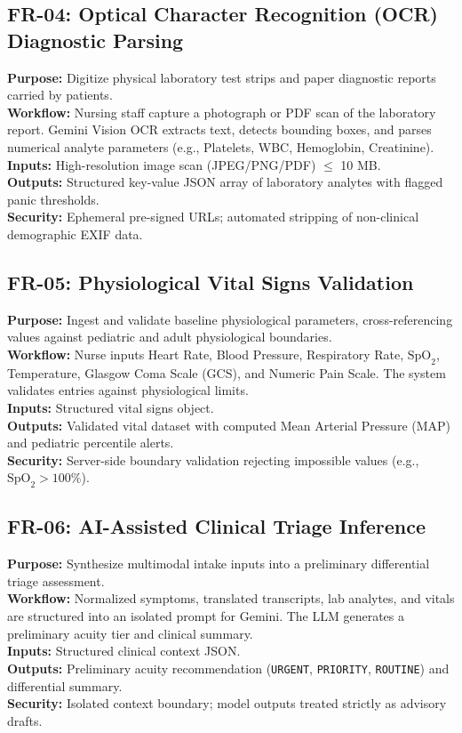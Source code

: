 \documentclass[11pt,a4paper,oneside]{report}
\begin{document}
\subsection{FR-04: Optical Character Recognition (OCR) Diagnostic Parsing}
\textbf{Purpose:} Digitize physical laboratory test strips and paper diagnostic reports carried by patients.\\
\textbf{Workflow:} Nursing staff capture a photograph or PDF scan of the laboratory report. Gemini Vision OCR extracts text, detects bounding boxes, and parses numerical analyte parameters (e.g., Platelets, WBC, Hemoglobin, Creatinine).\\
\textbf{Inputs:} High-resolution image scan (JPEG/PNG/PDF) $\le$ 10 MB.\\
\textbf{Outputs:} Structured key-value JSON array of laboratory analytes with flagged panic thresholds.\\
\textbf{Security:} Ephemeral pre-signed URLs; automated stripping of non-clinical demographic EXIF data.

\subsection{FR-05: Physiological Vital Signs Validation}
\textbf{Purpose:} Ingest and validate baseline physiological parameters, cross-referencing values against pediatric and adult physiological boundaries.\\
\textbf{Workflow:} Nurse inputs Heart Rate, Blood Pressure, Respiratory Rate, $\text{SpO}_2$, Temperature, Glasgow Coma Scale (GCS), and Numeric Pain Scale. The system validates entries against physiological limits.\\
\textbf{Inputs:} Structured vital signs object.\\
\textbf{Outputs:} Validated vital dataset with computed Mean Arterial Pressure (MAP) and pediatric percentile alerts.\\
\textbf{Security:} Server-side boundary validation rejecting impossible values (e.g., $\text{SpO}_2 > 100\%$).

\subsection{FR-06: AI-Assisted Clinical Triage Inference}
\textbf{Purpose:} Synthesize multimodal intake inputs into a preliminary differential triage assessment.\\
\textbf{Workflow:} Normalized symptoms, translated transcripts, lab analytes, and vitals are structured into an isolated prompt for Gemini. The LLM generates a preliminary acuity tier and clinical summary.\\
\textbf{Inputs:} Structured clinical context JSON.\\
\textbf{Outputs:} Preliminary acuity recommendation (\texttt{URGENT}, \texttt{PRIORITY}, \texttt{ROUTINE}) and differential summary.\\
\textbf{Security:} Isolated context boundary; model outputs treated strictly as advisory drafts.
\end{document}
